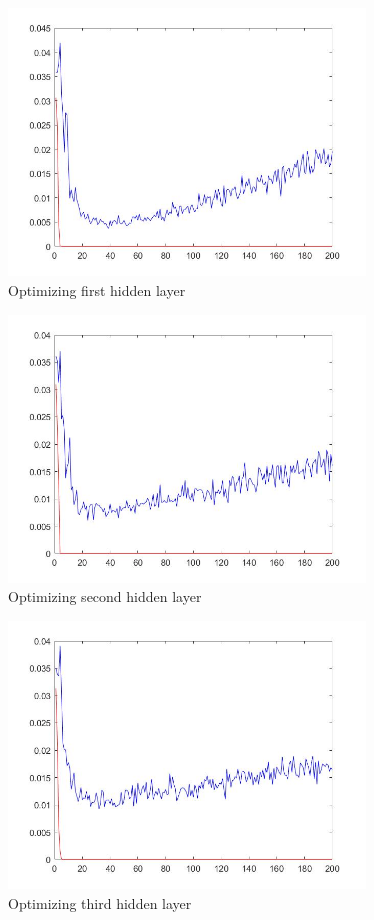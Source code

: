 \documentclass[12pt,a4paper,bold]{thesis}
\theoremstyle{thm}
\theoremstyle{definition}
\begin{document}
\begin{figure}[H]
	\centering
   \includegraphics[height=7.1cm]{Images/40.png} 
   \caption{Optimizing first hidden layer}
\end{figure}
\begin{figure}[H]
	\centering
   \includegraphics[height=7.1cm]{Images/41.png} 
   \caption{Optimizing second hidden layer}
\end{figure}
\begin{figure}[H]
	\centering
   \includegraphics[height=7.1cm]{Images/42.png} 
   \caption{Optimizing third hidden layer}
\end{figure}
\end{document}
